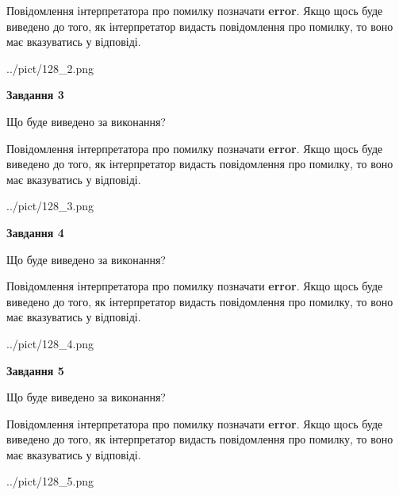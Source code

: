 \documentclass[12pt, ukrainian]{article}
\begin{document}
{\begin {large}
Повідомлення інтерпретатора про помилку позначати \textbf{error}.
Якщо щось буде виведено до того, як інтерпретатор видасть повідомлення про помилку, 
то воно має вказуватись у відповіді. \par


\begin{center}
	{../pict/128_2.png}
\end{center}
\newpage

{\begin {center}\textbf{Завдання 3}\end {center}}\par
Що буде виведено за виконання?

Повідомлення інтерпретатора про помилку позначати \textbf{error}.
Якщо щось буде виведено до того, як інтерпретатор видасть повідомлення про помилку, 
то воно має вказуватись у відповіді. \par


\begin{center}
	{../pict/128_3.png}
\end{center}
\newpage

{\begin {center}\textbf{Завдання 4}\end {center}}\par
Що буде виведено за виконання?

Повідомлення інтерпретатора про помилку позначати \textbf{error}.
Якщо щось буде виведено до того, як інтерпретатор видасть повідомлення про помилку, 
то воно має вказуватись у відповіді. \par


\begin{center}
	{../pict/128_4.png}
\end{center}
\newpage

{\begin {center}\textbf{Завдання 5}\end {center}}\par
Що буде виведено за виконання?

Повідомлення інтерпретатора про помилку позначати \textbf{error}.
Якщо щось буде виведено до того, як інтерпретатор видасть повідомлення про помилку, 
то воно має вказуватись у відповіді. \par


\begin{center}
	{../pict/128_5.png}
\end{center}
\newpage


\end{large}}
\end{document}
